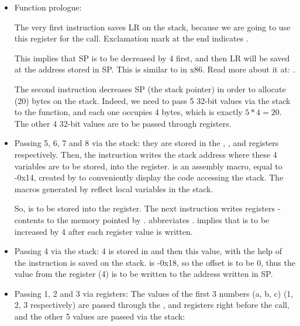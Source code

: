 \begin{itemize}
\item Function prologue:

The very first  instruction saves \ac{LR} on the stack, because we are going to use this register for the \printf call.
Exclamation mark at the end indicates .

This implies that \ac{SP} is to be decreased by 4 first, and then \ac{LR} will be saved at the address stored in \ac{SP}.
This is similar to \PUSH in x86.
Read more about it at: .

The second  instruction decreases \ac{SP} (the \gls{stack pointer}) in order to allocate  (20) bytes on the stack.
Indeed, we need to pass 5 32-bit values via the stack to the \printf function, and each one occupies 4 bytes, which is exactly $5*4=20$.
The other 4 32-bit values are to be passed through registers.

\item Passing 5, 6, 7 and 8 via the stack: they are stored in the , ,  and  registers respectively.
Then, the  instruction writes the stack address where these 4 variables are to be stored, into the  register.
 is an assembly macro, equal to -0x14, created by \IDA to conveniently display the code accessing the stack.
The  macros generated by \IDA reflect local variables in the stack.

So,  is to be stored into the  register.
The next  instruction writes registers - contents to the memory pointed by .
 abbreviates . 
 implies that  is to be increased by 4 after each register value is written.

\item Passing 4 via the stack: 4 is stored in  and then this value, with the help of the  instruction is saved on the stack.
 is -0x18, so the offset is to be 0, thus the value from the  register (4) is to be written to the address written in \ac{SP}.

\item Passing 1, 2 and 3 via registers:
The values of the first 3 numbers (a, b, c) (1, 2, 3 respectively) are passed through the 
,  and 
registers right before the \printf call, and the other
5 values are passed via the stack:


\end{itemize}
